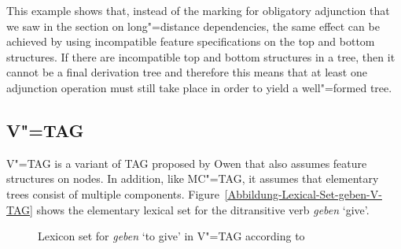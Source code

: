 This example shows that, instead of the marking for obligatory adjunction that we saw in the section on long"=distance
dependencies, the same effect can be achieved by using incompatible feature specifications on the top and bottom structures.
If there are incompatible top and bottom structures in a tree, then it cannot be a final derivation
tree and therefore this means that at least one adjunction operation must still take place in order
to yield a well"=formed tree.

\subsection{V"=TAG}
\label{sec-vtag}

V"=TAG 
is a variant of TAG proposed by Owen \citet{Rambow94a} that also assumes feature structures on
nodes. In addition, like MC"=TAG, it assumes that elementary trees consist of multiple components. Figure~\vref{Abbildung-Lexical-Set-geben-V-TAG} shows the elementary lexical set
for the ditransitive verb \emph{geben} `give'.
\begin{figure}
\vspace{4\baselineskip}
\vspace{.4\baselineskip}
\caption{\label{Abbildung-Lexical-Set-geben-V-TAG}Lexicon set for \emph{geben} `to give' in V"=TAG
  according to \citet[]{Rambow94a}}
\end{figure}%
